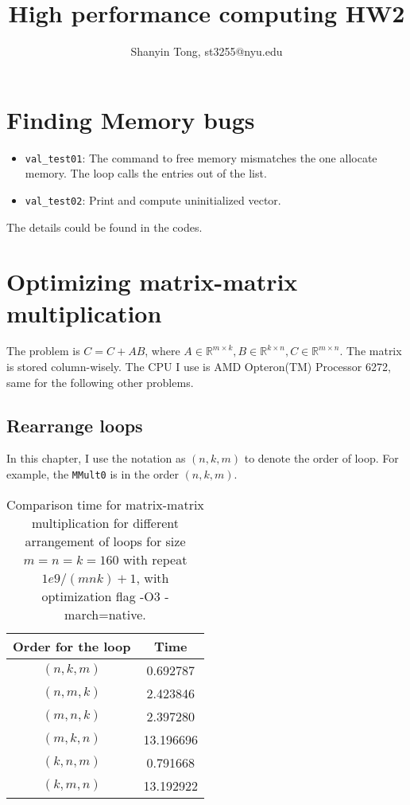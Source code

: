 \documentclass[10pt,a4paper]{article}
\theoremstyle{dotlessP}
\def\RR{\mathbb{R}}
\begin{document}
\title{High performance computing HW2}
\author{Shanyin Tong, st3255@nyu.edu}

\maketitle

\section{Finding Memory bugs}
\begin{itemize}
	\item \texttt{val\_test01}: The command to free memory mismatches the one allocate memory. The loop calls the entries out of the list.
	\item \texttt{val\_test02}: Print and compute uninitialized vector.
\end{itemize}
The details could be found in the codes.

\section{Optimizing matrix-matrix multiplication}
The problem is $C=C+AB$, where $A\in\RR^{m\times k}, B\in\RR^{k\times n}, C\in \RR^{m\times n}$. The matrix is stored column-wisely. The CPU I use is AMD Opteron(TM) Processor 6272, same for the following other problems.
\subsection{Rearrange loops}
In this chapter, I use the notation as $(n,k,m)$ to denote the order of loop. For example, the \texttt{MMult0} is in the order $(n,k,m)$.


	\begin{table}[tbhp] 
	\footnotesize
		\caption{Comparison time for matrix-matrix multiplication for different arrangement of loops for size $m=n=k=160$ with repeat $1e9/(mnk)+1$, with optimization flag -O3 -march=native.
		}\label{tab:loop}
		\begin{center}
\begin{tabular}{|c|c|}
	\hline 
Order for the loop	& Time \\ 
	\hline 
$(n,k,m)$	& 0.692787 \\ \hline 
$(n,m,k)$ &  2.423846\\\hline 
$(m,n,k)$ &  2.397280 \\ \hline 
$(m,k,n)$ & 13.196696 \\\hline
$(k,n,m)$ &  0.791668\\ \hline 
$(k,m,n)$ & 13.192922 \\\hline
\end{tabular} 
\end{center}
	
\end{table}
\end{document}
